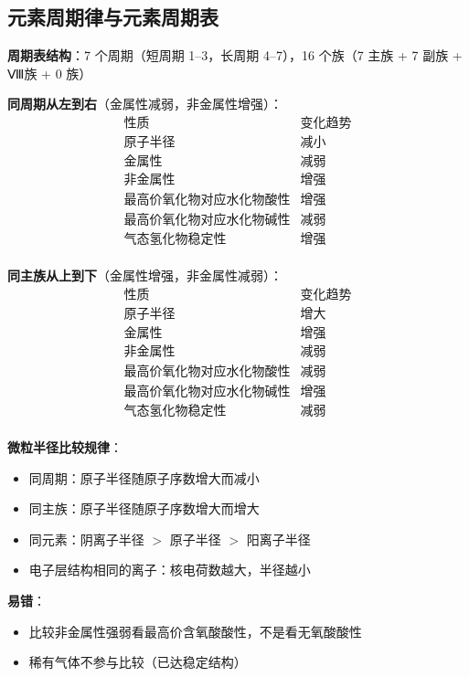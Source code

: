 \subsection{元素周期律与元素周期表}

\textbf{周期表结构}：7 个周期（短周期 1--3，长周期 4--7），16 个族（7 主族 + 7 副族 + Ⅷ族 + 0 族）

\textbf{同周期从左到右}（金属性减弱，非金属性增强）：
\[
\begin{array}{c|c}
\text{性质} & \text{变化趋势} \\ \hline
\text{原子半径} & \text{减小} \\
\text{金属性} & \text{减弱} \\
\text{非金属性} & \text{增强} \\
\text{最高价氧化物对应水化物酸性} & \text{增强} \\
\text{最高价氧化物对应水化物碱性} & \text{减弱} \\
\text{气态氢化物稳定性} & \text{增强} \\
\end{array}
\]

\textbf{同主族从上到下}（金属性增强，非金属性减弱）：
\[
\begin{array}{c|c}
\text{性质} & \text{变化趋势} \\ \hline
\text{原子半径} & \text{增大} \\
\text{金属性} & \text{增强} \\
\text{非金属性} & \text{减弱} \\
\text{最高价氧化物对应水化物酸性} & \text{减弱} \\
\text{最高价氧化物对应水化物碱性} & \text{增强} \\
\text{气态氢化物稳定性} & \text{减弱} \\
\end{array}
\]

\textbf{微粒半径比较规律}：
\begin{itemize}
  \item 同周期：原子半径随原子序数增大而减小
  \item 同主族：原子半径随原子序数增大而增大
  \item 同元素：阴离子半径 $>$ 原子半径 $>$ 阳离子半径
  \item 电子层结构相同的离子：核电荷数越大，半径越小
\end{itemize}

\textbf{易错}：
\begin{itemize}
  \item 比较非金属性强弱看最高价含氧酸酸性，不是看无氧酸酸性
  \item 稀有气体不参与比较（已达稳定结构）
\end{itemize}

